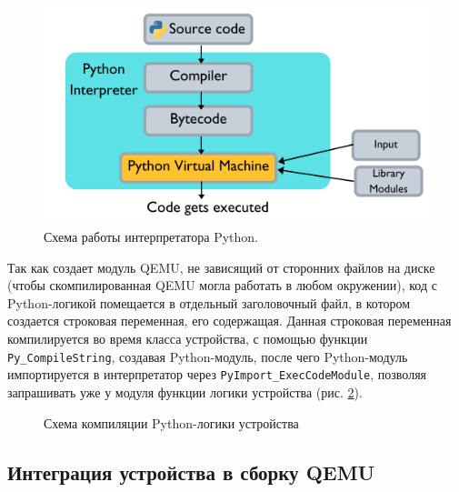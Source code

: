 \begin{figure}[!htbp]
    \centering
    \begin{adjustbox}{max totalsize={\textwidth}{\textheight}}
        \includegraphics[]{images/python-interpreter.png}
    \end{adjustbox}
    \caption{Схема работы интерпретатора Python.}\label{fig:python-interpreter}
\end{figure}

Так как {\mylanguage} создает модуль QEMU, не зависящий от сторонних файлов
на диске (чтобы скомпилированная QEMU могла работать в любом окружении),
код с Python-логикой помещается в отдельный заголовочный файл, в котором
создается строковая переменная, его содержащая.
Данная строковая переменная компилируется во время класса устройства,
с помощью функции \texttt{Py\_CompileString}, создавая Python-модуль,
после чего Python-модуль импортируется в интерпретатор
через \texttt{PyImport\_ExecCodeModule}, позволяя запрашивать уже у модуля
функции логики устройства (рис. \ref{fig:qemu-python-startup}).

\begin{figure}[!htbp]
    \centering
    \hspace*{-11.5cm}
    \begin{minipage}{10cm}
        
    \end{minipage}
    \caption{Схема компиляции Python-логики устройства}\label{fig:qemu-python-startup}
\end{figure}


\subsection{Интеграция устройства в сборку QEMU}\label{sec:ch2/sec1/sub7}

